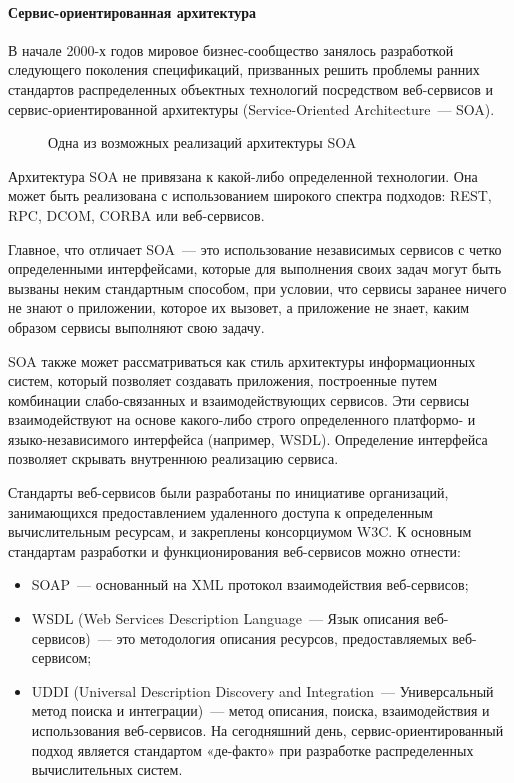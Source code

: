 \paragraph{Сервис-ориентированная архитектура}
В начале 2000-х годов мировое бизнес-сообщество занялось разработкой следующего поколения спецификаций, призванных решить проблемы ранних стандартов распределенных объектных технологий посредством веб-сервисов и сервис-ориентированной архитектуры (Service-Oriented Architecture~--- SOA).

\begin{figure}[h]
\caption{Одна из возможных реализаций архитектуры SOA}
\label{0:soa}
\end{figure}

Архитектура SOA не привязана к какой-либо определенной технологии. Она может быть реализована с использованием широкого спектра подходов: REST, RPC, DCOM, CORBA или веб-сервисов.

Главное, что отличает SOA~--- это использование независимых сервисов с четко определенными интерфейсами, которые для выполнения своих задач могут быть вызваны неким стандартным способом, при условии, что сервисы заранее ничего не знают о приложении, которое их вызовет, а приложение не знает, каким образом сервисы выполняют свою задачу.

SOA также может рассматриваться как стиль архитектуры информационных систем, который позволяет создавать приложения, построенные путем комбинации слабо-связанных и взаимодействующих сервисов. Эти сервисы взаимодействуют на основе какого-либо строго определенного платформо- и языко-независимого интерфейса (например, WSDL). Определение интерфейса позволяет скрывать внутреннюю реализацию сервиса.

Стандарты веб-сервисов были разработаны по инициативе организаций, занимающихся предоставлением удаленного доступа к определенным вычислительным ресурсам, и закреплены консорциумом W3C. К основным стандартам разработки и функционирования веб-сервисов можно отнести:
\begin{itemize}
\item SOAP~--- основанный на XML протокол взаимодействия веб-сервисов;
\item WSDL (Web Services Description Language~--- Язык описания веб-сервисов)~--- это методология описания ресурсов, предоставляемых веб-сервисом;
\item UDDI (Universal Description Discovery and Integration~--- Универсальный метод поиска и интеграции)~--- метод описания, поиска, взаимодействия и использования веб-сервисов. На сегодняшний день, сервис-ориентированный подход является стандартом «де-факто» при разработке распределенных вычислительных систем.
\end{itemize}

